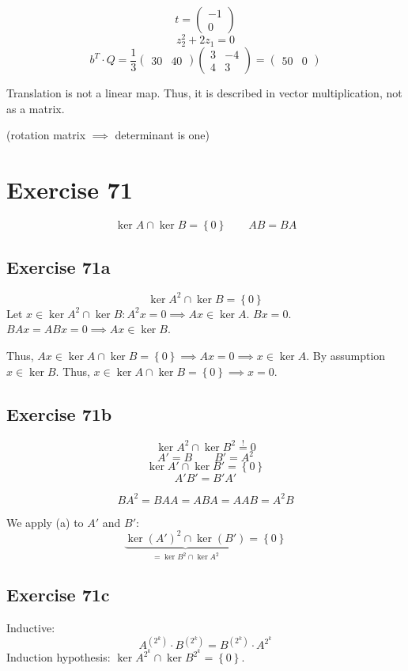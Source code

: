 \documentclass[a4paper]{article}
\theoremstyle{definition}
\newcommand\set[1]{\left\{#1\right\}}
\begin{document}
\[ t = \begin{pmatrix} -1 \\ 0 \end{pmatrix} \]
\[ z_2^2 + 2z_1 = 0 \]
\[ b^T \cdot Q = \frac13 \begin{pmatrix} 30 & 40 \end{pmatrix} \begin{pmatrix} 3 & -4 \\ 4 & 3 \end{pmatrix} = \begin{pmatrix} 50 & 0 \end{pmatrix} \]

Translation is not a linear map. Thus, it is described in vector multiplication, not as a matrix.

(rotation matrix $\implies$ determinant is one)

\section{Exercise 71}
\[ \ker{A} \cap \ker{B} = \set{0} \qquad AB = BA \]

\subsection{Exercise 71a}
\[ \ker{A^2} \cap \ker{B} = \set{0} \]
Let $x \in \ker{A^2} \cap \ker{B}: A^2 x = 0 \implies Ax \in \ker{A}$.
$Bx = 0$. $BAx = ABx = 0 \implies Ax \in \ker{B}$.

Thus, $Ax \in \ker{A} \cap \ker{B} = \set{0} \implies Ax = 0 \implies x \in \ker{A}$. By assumption $x \in \ker{B}$. Thus, $x \in \ker{A} \cap \ker{B} = \set{0} \implies x = 0$.

\subsection{Exercise 71b}
\[ \ker{A^2} \cap \ker{B^2} \overset!= 0 \]
\[ A' = B \qquad B' = A^2 \]
\[ \ker{A'} \cap \ker{B'} = \set{0} \]
\[ A' B' = B' A' \]

\[ BA^2 = BAA = ABA = AAB = A^2 B \]

We apply (a) to $A'$ and $B'$:
\[ \underbrace{\ker(A')^2 \cap \ker(B')}_{= \ker{B^2} \cap \ker{A^2}} = \set{0} \]

\subsection{Exercise 71c}
Inductive:
\[ A^{(2^k)} \cdot B^{(2^k)} = B^{(2^k)} \cdot A^{2^k} \]
Induction hypothesis: $\ker{A^{2^k}} \cap \ker{B^{2^k}} = \set{0}$.
\end{document}
